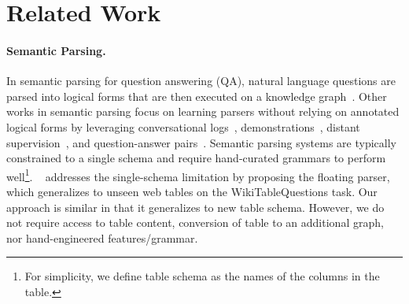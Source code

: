 \documentclass{article} %
\begin{document}


\section{Related Work}
\vspace{-2mm}

\paragraph{Semantic Parsing.}
In semantic parsing for question answering (QA), natural language questions are parsed into logical forms that are then executed on a knowledge graph~\citep{zelle1996LearningTP,wong2007LearningSG,zettlemoyer2005LearningTM,Zettlemoyer2007OnlineLO}.
Other works in semantic parsing focus on learning parsers without relying on annotated logical forms by leveraging conversational logs~\citep{Artzi2011BootstrappingSP}, demonstrations~\citep{Artzi2013WeaklySL}, distant supervision~\citep{cai2013LargescaleSP,Reddy2014LargescaleSP}, and question-answer pairs~\citep{Liang2011LearningDC}.
Semantic parsing systems are typically constrained to a single schema and require hand-curated grammars to perform well\footnote{For simplicity, we define table schema as the names of the columns in the table.}.
~\citet{Pasupat2015CompositionalSP} addresses the single-schema limitation by proposing the floating parser, which generalizes to unseen web tables on the WikiTableQuestions task.
Our approach is similar in that it generalizes to new table schema.
However, we do not require access to table content, conversion of table to an additional graph, nor hand-engineered features/grammar.
\end{document}
